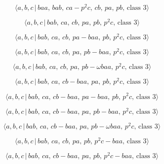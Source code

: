 \documentclass[10pt]{article}
\begin{document}
\begin{equation}
\langle a,b,c\,|\,baa,\,bab,\,ca-p^2c,\,cb,\,pa,\,pb,\,\text{class }3\rangle
\tag{6.217}
\end{equation}

\begin{equation}
\langle a,b,c\,|\,bab,\,ca,\,cb,\,pa,\,pb,\,p^2c,\,\text{class }3\rangle 
\tag{6.218}
\end{equation}

\begin{equation}
\langle a,b,c\,|\,bab,\,ca,\,cb,\,pa-baa,\,pb,\,p^2c,\,\text{class }3\rangle
\tag{6.219}
\end{equation}

\begin{equation}
\langle a,b,c\,|\,bab,\,ca,\,cb,\,pa,\,pb-baa,\,p^2c,\,\text{class }3\rangle
\tag{6.220}
\end{equation}

\begin{equation}
\langle a,b,c\,|\,bab,\,ca,\,cb,\,pa,\,pb-\omega baa,\,p^2c,\,\text{class }%
3\rangle  \tag{6.221}
\end{equation}

\begin{equation}
\langle a,b,c\,|\,bab,\,ca,\,cb-baa,\,pa,\,pb,\,p^2c,\,\text{class }3\rangle
\tag{6.222}
\end{equation}

\begin{equation}
\langle a,b,c\,|\,bab,\,ca,\,cb-baa,\,pa-baa,\,pb,\,p^2c,\,\text{class }%
3\rangle  \tag{6.223}
\end{equation}

\begin{equation}
\langle a,b,c\,|\,bab,\,ca,\,cb-baa,\,pa,\,pb-baa,\,p^2c,\,\text{class }%
3\rangle  \tag{6.224}
\end{equation}

\begin{equation}
\langle a,b,c\,|\,bab,\,ca,\,cb-baa,\,pa,\,pb-\omega baa,\,p^2c,\,\text{
class }3\rangle  \tag{6.225}
\end{equation}

\begin{equation}
\langle a,b,c\,|\,bab,\,ca,\,cb,\,pa,\,pb,\,p^2c-baa,\,\text{class }3\rangle
\tag{6.226}
\end{equation}

\begin{equation}
\langle a,b,c\,|\,bab,\,ca,\,cb-baa,\,pa,\,pb,\,p^2c-baa,\,\text{class }%
3\rangle  \tag{6.227}
\end{equation}
\end{document}
